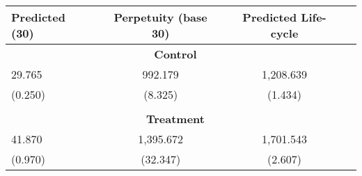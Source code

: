 \begin{tabular}{lccc} \toprule
Predicted (30) & Perpetuity (base 30) & Predicted Life-cycle\\  \midrule
\multicolumn{3}{c}{\textbf{Control}} \\
   29.765 &   992.179 &  1,208.639 \\  
    (0.250) &     (8.325) &     (1.434) \\  \\
    \multicolumn{3}{c}{\textbf{Treatment}} \\
   41.870 &  1,395.672 &  1,701.543 \\  
    (0.970) &    (32.347) &     (2.607) \\  \bottomrule \end{tabular}
